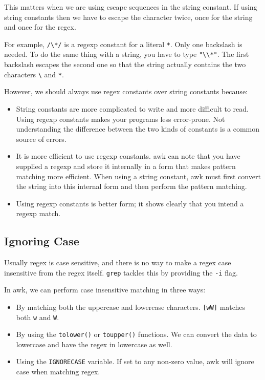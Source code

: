 This matters when we are using escape sequences in the string constant. If using string constants then we have to escape the character twice, once for the string and once for the regex.

For example, \lstinline|/\*/| is a regexp constant for a literal \lstinline|*|. Only one backslash is needed. To do the same thing with a string, you have to type \lstinline|"\\*"|. The first backslash escapes the second one so that the string actually contains the two characters \lstinline|\| and \lstinline|*|.

However, we should always use regex constants over string constants because:

\begin{itemize}
  \item String constants are more complicated to write and more difficult to read. Using regexp constants makes your programs less error-prone. Not understanding the difference between the two kinds of constants is a common source of errors.
  \item It is more efficient to use regexp constants. awk can note that you have supplied a regexp and store it internally in a form that makes pattern matching more efficient. When using a string constant, awk must first convert the string into this internal form and then perform the pattern matching.
  \item Using regexp constants is better form; it shows clearly that you intend a regexp match.
\end{itemize}

\subsection{Ignoring Case}

Usually regex is case sensitive, and there is no way to make a regex case insensitive from the regex itself.
\lstinline|grep| tackles this by providing the \lstinline|-i| flag.

In awk, we can perform case insensitive matching in three ways:

\begin{itemize}
  \item By matching both the uppercase and lowercase characters.
    \lstinline|[wW]| matches both \lstinline|w| and \lstinline|W|.
  \item By using the \lstinline|tolower()| or \lstinline|toupper()| functions. We can convert the data to lowercase and have the regex in lowercase as well.
  \item Using the \lstinline|IGNORECASE| variable. If set to any non-zero value, awk will ignore case when matching regex.
\end{itemize}

